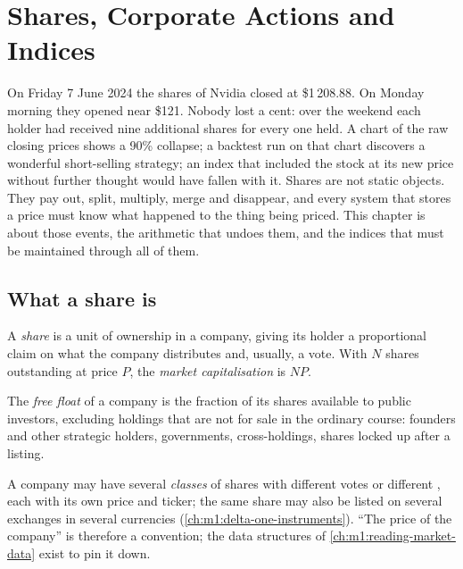 \chapter{Shares, Corporate Actions and Indices}\label{ch:m1:shares-corporate-actions-indices}

On Friday 7 June 2024 the shares of Nvidia closed at \$1\,208.88. On Monday
morning they opened near \$121. Nobody lost a cent: over the weekend each
holder had received nine additional shares for every one held. A chart of
the raw closing prices shows a 90\% collapse; a backtest run on that chart
discovers a wonderful short-selling strategy; an index that included the
stock at its new price without further thought would have fallen with it.
Shares are not static objects. They pay out, split, multiply, merge and
disappear, and every system that stores a price must know what happened to
the thing being priced. This chapter is about those events, the arithmetic
that undoes them, and the indices that must be maintained through all of
them.

\section{What a share is}

\begin{definition}\label{def:m1:shares-corporate-actions-indices:share}
A \emph{share} is a unit of ownership in a company, giving its
holder a proportional claim on what the company distributes and, usually, a
vote. With $N$ shares outstanding at price $P$, the
\emph{market capitalisation} is $NP$.
\end{definition}

\begin{definition}\label{def:m1:shares-corporate-actions-indices:float}
The \emph{free float} of a company is the fraction of its
shares available to public investors, excluding holdings that are not for
sale in the ordinary course: founders and other strategic holders,
governments, cross-holdings, shares locked up after a listing.
\end{definition}

A company may have several \emph{classes} of shares with different votes or
different , each with its own price and ticker; the same share may
also be listed on several exchanges in several currencies
(\cref{ch:m1:delta-one-instruments}). ``The price of the company'' is
therefore a convention; the data structures of \cref{ch:m1:reading-market-data}
exist to pin it down.


